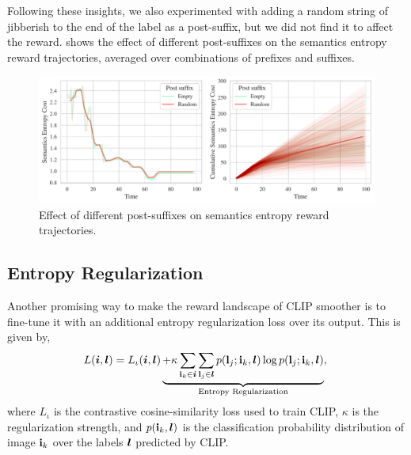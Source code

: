 Following these insights, we also experimented with adding a random string of jibberish to the end of the label as a post-suffix, but we did not find it to affect the reward.
 shows the effect of different post-suffixes on the semantics entropy reward trajectories, averaged over combinations of prefixes and suffixes.

\begin{figure}[H]
    \centering
    \includegraphics[width=\textwidth]{images/post_suffix_comparison.pdf}
    \caption{Effect of different post-suffixes on semantics entropy reward trajectories.}
    \label{fig:post-suffix}
\end{figure}


\subsection{Entropy Regularization}
\label{sec:entropy-regularization}
Another promising way to make the reward landscape of CLIP smoother is to fine-tune it with an additional entropy regularization loss over its output.
This is given by,
\begin{equation}
    \label{eq:entropy-regularization}
    L(\bm{i}, \bm{l}) = L_{\iota}(\bm{i}, \bm{l}) \underbrace{+ \kappa \sum_{\mathbf{i}_k \in \bm{i}}\sum_{\mathbf{l}_j \in \bm{l}} p(\mathbf{l}_j; \mathbf{i}_k, \bm{l}) \log p(\mathbf{l}_j; \mathbf{i}_k, \bm{l})}_{\text{Entropy Regularization}},\\
\end{equation}
where \(L_{\iota}\) is the contrastive cosine-similarity loss used to train CLIP, $\kappa$ is the regularization strength, and \(p(\mathbf{i}_k, \bm{l})\) is the classification probability distribution of image \(\mathbf{i}_k\) over the labels \(\bm{l}\) predicted by CLIP.

